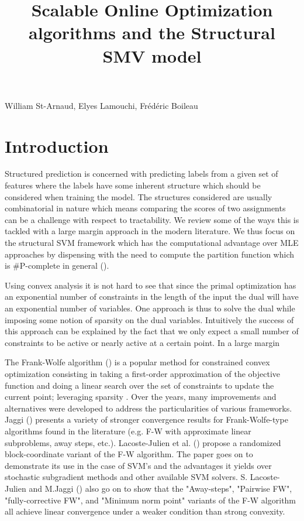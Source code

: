 \documentclass{article}
\title{Scalable Online Optimization algorithms and the Structural SMV model}
\date{}
\begin{document}
 

\maketitle


\vspace{-0.5in}
\begin{center}
William St-Arnaud, Elyes Lamouchi, Fr\'ed\'eric Boileau
\end{center}
\vspace{0.2in}


\section*{Introduction}
Structured prediction is concerned with predicting labels from a given
set of features where the labels have some inherent structure which should
be considered when training the model. The structures considered are usually
combinatorial in nature which means comparing the scores of two assignments
can be a challenge with respect to tractability. We review some of the ways
this is tackled with a large margin approach in the modern literature.
We thus focus on the structural SVM framework which has the computational
advantage over MLE approaches by dispensing with the need to compute the
partition function which is \#P-complete in general (\cite{dualextraSimon}).

Using convex analysis it is not hard to see that since the primal optimization
has an exponential number of constraints in the length of the input the dual
will have an exponential number of variables. One approach is thus to solve
the dual while imposing some notion of sparsity on the dual variables.
Intuitively the success of this approach can be explained by the fact that we
only expect a small number of constraints to be active or nearly active at a
certain point. In a large margin 

The Frank-Wolfe algorithm (\cite{f-w}) is a popular method for
constrained convex optimization consisting in taking a first-order approximation
of the objective function and doing a linear search over the set of constraints
to update the current point; leveraging sparsity . Over the years, many improvements and alternatives
were developed to address the particularities of various frameworks. Jaggi
(\cite{Jaggi:229246}) presents a variety of stronger convergence results for
Frank-Wolfe-type algorithms found in the literature (e.g. F-W with approximate
linear subproblems, away steps, etc.). Lacoste-Julien et al.
(\cite{dualextraSimon}) propose a randomized block-coordinate
variant of the F-W algorithm. The paper goes on to demonstrate its use in the
case of SVM's and the advantages it yields over stochastic subgradient methods
and other available SVM solvers. S. Lacoste-Julien and M.Jaggi
(\cite{2015arXiv151105932L}) also go on to show that the "Away-steps", "Pairwise
FW", "fully-corrective FW", and "Minimum norm point" variants of the F-W
algorithm all achieve linear convergence under a weaker condition than strong
convexity.
\end{document}
